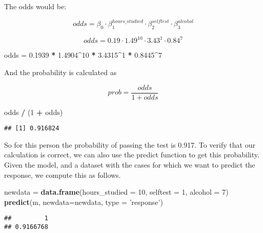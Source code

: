 \documentclass[
]{article}
\newenvironment{Shaded}{\begin{snugshade}}{\end{snugshade}}
\newcommand{\DataTypeTok}[1]{\textcolor[rgb]{0.13,0.29,0.53}{#1}}
\newcommand{\DecValTok}[1]{\textcolor[rgb]{0.00,0.00,0.81}{#1}}
\newcommand{\FloatTok}[1]{\textcolor[rgb]{0.00,0.00,0.81}{#1}}
\newcommand{\KeywordTok}[1]{\textcolor[rgb]{0.13,0.29,0.53}{\textbf{#1}}}
\newcommand{\NormalTok}[1]{#1}
\newcommand{\OperatorTok}[1]{\textcolor[rgb]{0.81,0.36,0.00}{\textbf{#1}}}
\newcommand{\StringTok}[1]{\textcolor[rgb]{0.31,0.60,0.02}{#1}}
\begin{document}
The odds would be:

\[odds = \beta_0 \cdot \beta_1^{hours\_studied} \cdot \beta_2^{selftest} \cdot \beta_3^{alcohol}\]

\[odds = 0.19 \cdot 1.49^{10} \cdot 3.43^1 \cdot 0.84^{7}  \]

\begin{Shaded}
\begin{Highlighting}[]
\NormalTok{odds =}\StringTok{ }\FloatTok{0.1939} \OperatorTok{*}\StringTok{ }\FloatTok{1.4904}\OperatorTok{^}\DecValTok{10} \OperatorTok{*}\StringTok{ }\FloatTok{3.4315}\OperatorTok{^}\DecValTok{1} \OperatorTok{*}\StringTok{ }\FloatTok{0.8445}\OperatorTok{^}\DecValTok{7}
\end{Highlighting}
\end{Shaded}

And the probability is calculated as

\[ prob = \frac{odds}{1+odds}\]

\begin{Shaded}
\begin{Highlighting}[]
\NormalTok{odds }\OperatorTok{/}\StringTok{ }\NormalTok{(}\DecValTok{1} \OperatorTok{+}\StringTok{ }\NormalTok{odds)}
\end{Highlighting}
\end{Shaded}

\begin{verbatim}
## [1] 0.916824
\end{verbatim}

So for this person the probability of passing the test is 0.917. To
verify that our calculation is correct, we can also use the predict
function to get this probability. Given the model, and a dataset with
the cases for which we want to predict the response, we compute this as
follows.

\begin{Shaded}
\begin{Highlighting}[]
\NormalTok{newdata =}\StringTok{ }\KeywordTok{data.frame}\NormalTok{(}\DataTypeTok{hours_studied =} \DecValTok{10}\NormalTok{, }\DataTypeTok{selftest =} \DecValTok{1}\NormalTok{, }\DataTypeTok{alcohol =} \DecValTok{7}\NormalTok{)}
\KeywordTok{predict}\NormalTok{(m, }\DataTypeTok{newdata=}\NormalTok{newdata, }\DataTypeTok{type =} \StringTok{'response'}\NormalTok{)}
\end{Highlighting}
\end{Shaded}

\begin{verbatim}
##         1 
## 0.9166768
\end{verbatim}
\end{document}

